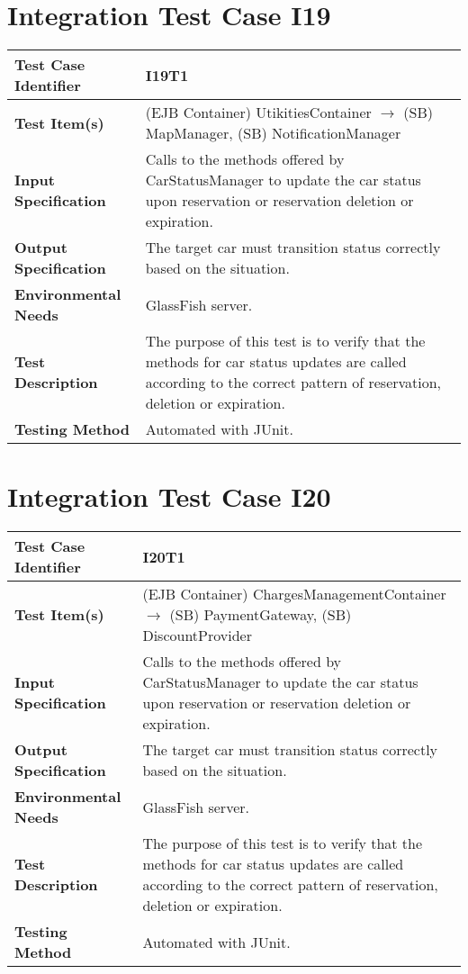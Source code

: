 \section{Integration Test Case I19}

\begin{longtable}{p{} | p{}}
\textbf{Test Case Identifier} & I19T1\\
\hline
\textbf{Test Item(s)} & (EJB Container) UtikitiesContainer $\rightarrow$ (SB) MapManager, (SB) NotificationManager \\
\hline
\textbf{Input Specification} & Calls to the methods offered by CarStatusManager to update the car status upon reservation or reservation deletion or expiration. \\
\hline
\textbf{Output Specification} & The target car must transition status correctly based on the situation. \\
\hline
\textbf{Environmental Needs} & GlassFish server. \\
\hline
\textbf{Test Description} & The purpose of this test is to verify that the methods for car status updates are called according to the correct pattern of reservation, deletion or expiration. \\
\hline
\textbf{Testing Method} & Automated with JUnit. \\
\hline
\end{longtable}

\section{Integration Test Case I20}

\begin{longtable}{p{} | p{}}
\textbf{Test Case Identifier} & I20T1\\
\hline
\textbf{Test Item(s)} & (EJB Container) ChargesManagementContainer $\rightarrow$ (SB) PaymentGateway, (SB) DiscountProvider \\
\hline
\textbf{Input Specification} & Calls to the methods offered by CarStatusManager to update the car status upon reservation or reservation deletion or expiration. \\
\hline
\textbf{Output Specification} & The target car must transition status correctly based on the situation. \\
\hline
\textbf{Environmental Needs} & GlassFish server. \\
\hline
\textbf{Test Description} & The purpose of this test is to verify that the methods for car status updates are called according to the correct pattern of reservation, deletion or expiration. \\
\hline
\textbf{Testing Method} & Automated with JUnit. \\
\hline
\end{longtable}

